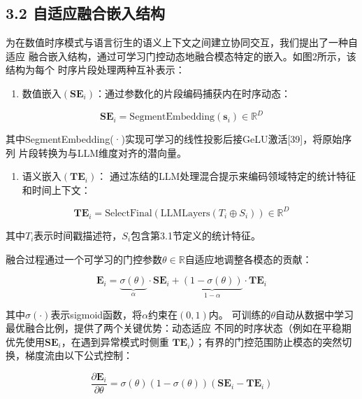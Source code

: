 \documentclass[
  10
]{article}
\providecommand{\tightlist}{%
  \setlength{\itemsep}{0pt}\setlength{\parskip}{0pt}}
\begin{document}
\subsection{3.2 自适应融合嵌入结构}\label{adaptive-fusion-embedding-structure}

为在数值时序模式与语言衍生的语义上下文之间建立协同交互，我们提出了一种自适应
融合嵌入结构，通过可学习门控动态地融合模态特定的嵌入。如图2所示，该结构为每个
时序片段处理两种互补表示：

\begin{enumerate}
\def\labelenumi{(\arabic{enumi})}
\tightlist
\item
  数值嵌入\(\left( \mathbf{SE}_{i} \right)\)：通过参数化的片段编码捕获内在时序动态：
\end{enumerate}

\[
\mathbf{SE}_{i} = \mathrm{SegmentEmbedding} (\mathbf{s}_{i}) \in \mathbb{R}^{D}\tag{5}
\]

其中SegmentEmbedding(·)实现可学习的线性投影后接GeLU激活{[}39{]}，将原始序列
片段转换为与LLM维度对齐的潜向量。

\begin{enumerate}
\def\labelenumi{(\arabic{enumi})}
\setcounter{enumi}{1}
\tightlist
\item
  语义嵌入\(\left( \mathbf{TE}_{i} \right)\)：
  通过冻结的LLM处理混合提示来编码领域特定的统计特征和时间上下文：
\end{enumerate}

\[
\mathbf{TE}_{i} = \text{SelectFinal} \left(\text{LLMLayers} \left(T_{i} \oplus S_{i}\right)\right) \in \mathbb{R}^{D}\tag{6}
\]

其中\(T_{i}\)表示时间戳描述符，\(S_{i}\)包含第3.1节定义的统计特征。

融合过程通过一个可学习的门控参数\(\theta \in \mathbb{R}\)自适应地调整各模态的贡献：

\[
\mathbf{E}_{i} = \underbrace{\sigma(\theta)}_{\alpha} \cdot \mathbf{SE}_{i} + \underbrace{(1 - \sigma(\theta))}_{1 - \alpha} \cdot \mathbf{TE}_{i}\tag{7}
\]

其中\(\sigma(\cdot)\)表示sigmoid函数，将\(\alpha\)约束在\((0,1)\)内。
可训练的\(\theta\)自动从数据中学习最优融合比例，提供了两个关键优势：动态适应
不同的时序状态（例如在平稳期优先使用\(\mathbf{SE}_{i}\)，在遇到异常模式时侧重
\(\mathbf{TE}_{i}\)）；有界的门控范围防止模态的突然切换，梯度流由以下公式控制：

\[
\frac{\partial \mathbf{E}_{i}}{\partial \theta} = \sigma(\theta)(1 - \sigma(\theta))(\mathbf{SE}_{i} - \mathbf{TE}_{i})\tag{8}
\]
\end{document}
